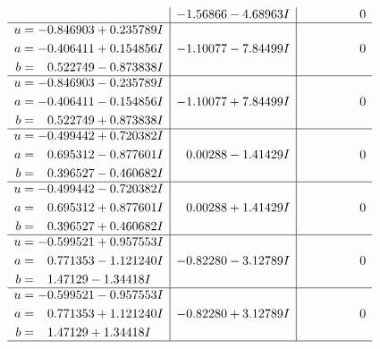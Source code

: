 \documentclass[1p]{elsarticle_modified}
\theoremstyle{definition}
\begin{document}
$$\begin{array}{c|c|c}
 & -1.56866 - 4.68963 I & \phantom{-0.000000 } 0 \\ \hline\begin{aligned}
u &= -0.846903 + 0.235789 I \\
a &= -0.406411 + 0.154856 I \\
b &= \phantom{-}0.522749 - 0.873838 I\end{aligned}
 & -1.10077 - 7.84499 I & \phantom{-0.000000 } 0 \\ \hline\begin{aligned}
u &= -0.846903 - 0.235789 I \\
a &= -0.406411 - 0.154856 I \\
b &= \phantom{-}0.522749 + 0.873838 I\end{aligned}
 & -1.10077 + 7.84499 I & \phantom{-0.000000 } 0 \\ \hline\begin{aligned}
u &= -0.499442 + 0.720382 I \\
a &= \phantom{-}0.695312 - 0.877601 I \\
b &= \phantom{-}0.396527 - 0.460682 I\end{aligned}
 & \phantom{-}0.00288 - 1.41429 I & \phantom{-0.000000 } 0 \\ \hline\begin{aligned}
u &= -0.499442 - 0.720382 I \\
a &= \phantom{-}0.695312 + 0.877601 I \\
b &= \phantom{-}0.396527 + 0.460682 I\end{aligned}
 & \phantom{-}0.00288 + 1.41429 I & \phantom{-0.000000 } 0 \\ \hline\begin{aligned}
u &= -0.599521 + 0.957553 I \\
a &= \phantom{-}0.771353 - 1.121240 I \\
b &= \phantom{-}1.47129 - 1.34418 I\end{aligned}
 & -0.82280 - 3.12789 I & \phantom{-0.000000 } 0 \\ \hline\begin{aligned}
u &= -0.599521 - 0.957553 I \\
a &= \phantom{-}0.771353 + 1.121240 I \\
b &= \phantom{-}1.47129 + 1.34418 I\end{aligned}
 & -0.82280 + 3.12789 I & \phantom{-0.000000 } 0\\
 \hline 
 \end{array}$$\newpage$$\begin{array}{c|c|c}  

\end{array}$$
\end{document}
